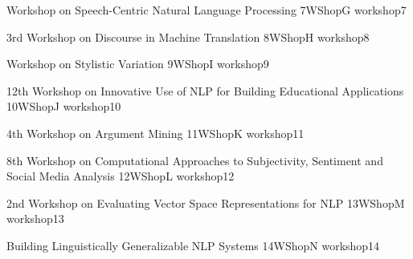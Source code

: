 \begin{wsschedule}
  {Workshop on Speech-Centric Natural Language Processing}
  {7}{WShopG}
  {workshop7}
  {\WShopLocG}
  
\end{wsschedule}
%
%  



\begin{wsschedule}
  {3rd Workshop on Discourse in Machine Translation}
  {8}{WShopH}
  {workshop8}
  {\WShopLocI}
  
\end{wsschedule}

\begin{wsschedule}
  {Workshop on Stylistic Variation}
  {9}{WShopI}
  {workshop9}
  {\WShopLocJ}
  
\end{wsschedule}

\begin{wsschedule}
  {12th Workshop on Innovative Use of NLP for Building Educational Applications}
  {10}{WShopJ}
  {workshop10}
  {\WShopLocK}
  
\end{wsschedule}

\begin{wsschedule}
  {4th Workshop on Argument Mining}
  {11}{WShopK}
  {workshop11}
  {\WShopLocL}
  
\end{wsschedule}

\begin{wsschedule}
  {8th Workshop on Computational Approaches to Subjectivity, Sentiment and Social Media Analysis}
  {12}{WShopL}
  {workshop12}
  {\WShopLocM}
  
\end{wsschedule}

\begin{wsschedule}
  {2nd Workshop on Evaluating Vector Space Representations for NLP}
  {13}{WShopM}
  {workshop13}
  {\WShopLocN}
  
\end{wsschedule}

\begin{wsschedule}
  {Building Linguistically Generalizable NLP Systems}
  {14}{WShopN}
  {workshop14}
  {\WShopLocO}
  
\end{wsschedule}


\clearpage{\thispagestyle{emptyheader}\cleardoublepage}
